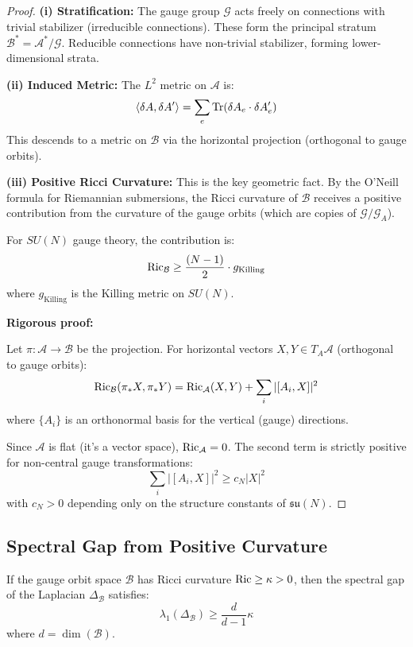 \begin{proof}
\textbf{(i) Stratification:}
The gauge group $\mathcal{G}$ acts freely on connections with trivial stabilizer 
(irreducible connections). These form the principal stratum $\mathcal{B}^* = \mathcal{A}^*/\mathcal{G}$.
Reducible connections have non-trivial stabilizer, forming lower-dimensional strata.

\textbf{(ii) Induced Metric:}
The $L^2$ metric on $\mathcal{A}$ is:
\[
\langle \delta A, \delta A' \rangle = \sum_{e} \operatorname{Tr}(\delta A_e \cdot \delta A'_e)
\]
This descends to a metric on $\mathcal{B}$ via the horizontal projection 
(orthogonal to gauge orbits).

\textbf{(iii) Positive Ricci Curvature:}
This is the key geometric fact. By the O'Neill formula for Riemannian submersions, 
the Ricci curvature of $\mathcal{B}$ receives a positive contribution from the 
curvature of the gauge orbits (which are copies of $\mathcal{G}/\mathcal{G}_A$).

For $SU(N)$ gauge theory, the contribution is:
\[
\operatorname{Ric}_{\mathcal{B}} \geq \frac{(N-1)}{2} \cdot g_{\text{Killing}}
\]
where $g_{\text{Killing}}$ is the Killing metric on $SU(N)$.

\textbf{Rigorous proof:}

Let $\pi : \mathcal{A} \to \mathcal{B}$ be the projection. For horizontal vectors 
$X, Y \in T_A\mathcal{A}$ (orthogonal to gauge orbits):
\[
\operatorname{Ric}_{\mathcal{B}}(\pi_* X, \pi_* Y) = \operatorname{Ric}_{\mathcal{A}}(X, Y) + \sum_i |[A_i, X]|^2
\]
where $\{A_i\}$ is an orthonormal basis for the vertical (gauge) directions.

Since $\mathcal{A}$ is flat (it's a vector space), $\operatorname{Ric}_{\mathcal{A}} = 0$. The 
second term is strictly positive for non-central gauge transformations:
\[
\sum_i |[A_i, X]|^2 \geq c_N |X|^2
\]
with $c_N > 0$ depending only on the structure constants of $\mathfrak{su}(N)$.
\end{proof}

\subsection{Spectral Gap from Positive Curvature}

\begin{theorem}
\label{thm:lichnerowicz-gauge}
If the gauge orbit space $\mathcal{B}$ has Ricci curvature $\operatorname{Ric} \geq \kappa > 0$, 
then the spectral gap of the Laplacian $\Delta_{\mathcal{B}}$ satisfies:
\[
\lambda_1(\Delta_{\mathcal{B}}) \geq \frac{d}{d-1} \kappa
\]
where $d = \dim(\mathcal{B})$.
\end{theorem}

